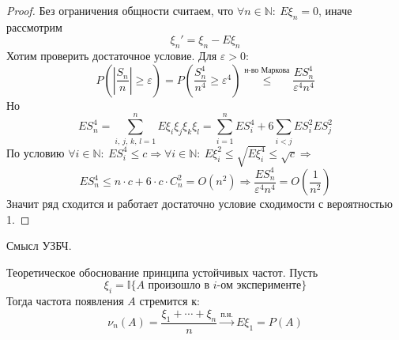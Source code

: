 \begin{proof}
	Без ограничения общности считаем, что $\forall n \in \mathbb{N}:\: E\xi_n = 0$, иначе рассмотрим
	\[\xi_n' = \xi_n - E\xi_n\]
	Хотим проверить достаточное условие. Для $\varepsilon > 0$:
	\[P\left(\left|\frac{S_n}{n}\right| \geq \varepsilon\right) = P\left(\frac{S_n^4}{n^4} \geq \varepsilon ^4\right) \stackrel{\text{н-во Маркова}}{\leq} \frac{ES_n^4}{\varepsilon^4n^4}\]
	Но
	\[ES_n^4 = \sum_{i,\,j,\,k,\,l = 1}^n E\xi_i\xi_j\xi_k\xi_l = \sum_{i = 1}^n ES_i^4 + 6\sum_{i < j}ES_i^2ES_j^2\]
	По условию $\forall i \in \mathbb{N}:\: ES_i^4 \leq c \Rightarrow \forall i \in \mathbb{N}:\: E\xi_i^2 \leq \sqrt{E\xi_i^4} \leq \sqrt{c} \Rightarrow$
	\[ES_n^4 \leq n\cdot c + 6\cdot c\cdot C_n^2 = O(n^2) \Rightarrow \frac{ES_n^4}{\varepsilon^4n^4} = O\left(\frac{1}{n^2}\right)\]
	Значит ряд сходится и работает достаточно условие сходимости с вероятностью 1.
\end{proof}

\begin{note}
	Смысл УЗБЧ.

	Теоретическое обоснование принципа устойчивых частот. Пусть
	\[\xi_i = \mathbb{I}\{A \text{ произошло в }i \text{-ом эксперименте}\}\]
	Тогда частота появления $A$ стремится к:
	\[\nu_n(A) = \frac{\xi_1 + \cdots + \xi_n}{n} \stackrel{\text{п.н.}}{\to} E\xi_1 = P(A)\]
\end{note}
